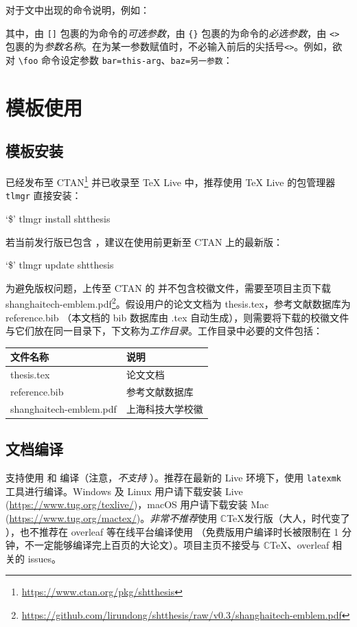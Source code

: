 \documentclass[master]{shtthesis}
\newcommand\prompt{\textup{\$}}
\providecommand{\emoji}[1]{ \fbox{\emph{#1}} }
\begin{document}
对于文中出现的命令说明，例如：
\begin{latex}
\end{latex}
其中，由 \verb|[]| 包裹的为命令的\emph{可选参数}，由 \verb|{}| 包裹的为命令的\emph{必选参数}，由 \verb|<>| 包裹的为\emph{参数名称}。在为某一参数赋值时，不必输入前后的尖括号\verb|<>|。例如，欲对 \verb|\foo| 命令设定参数 \verb|bar=this-arg|、\verb|baz=另一参数|：
\begin{latex}
\end{latex}

\chapter{模板使用}
\section{模板安装}
\shtthesis{} 已经发布至 CTAN\footnote{\url{https://www.ctan.org/pkg/shtthesis}} 并已收录至 \TeX{} Live 中，推荐使用 \TeX{} Live 的包管理器 \verb|tlmgr| 直接安装：
\begin{shell}
`\prompt' tlmgr install shtthesis
\end{shell}
若当前发行版已包含 \shtthesis{}，建议在使用前更新至 CTAN 上的最新版：
\begin{shell}
`\prompt' tlmgr update shtthesis
\end{shell}

为避免版权问题，上传至 CTAN 的 \shtthesis{} 并不包含校徽文件，需要至项目主页下载 shanghaitech-emblem.pdf\footnote{\url{https://github.com/lirundong/shtthesis/raw/v0.3/shanghaitech-emblem.pdf}}。假设用户的论文文档为 thesis.tex，参考文献数据库为 reference.bib （本文档的 bib 数据库由 \jobname.tex 自动生成），则需要将下载的校徽文件与它们放在同一目录下，下文称为\emph{工作目录}。工作目录中必要的文件包括：
\begin{center}
  \begin{tabular}{ll}
    \toprule
    文件名称 & 说明 \\
    \midrule 
    thesis.tex & 论文文档 \\
    reference.bib & 参考文献数据库 \\
    shanghaitech-emblem.pdf & 上海科技大学校徽 \\
    \bottomrule
  \end{tabular}
\end{center}

\section{文档编译}
\shtthesis{} 支持使用  和  编译（注意，\emph{不支持} ）。推荐在最新的  Live 环境下，使用 \verb|latexmk| 工具进行编译。Windows 及 Linux 用户请下载安装  Live (\url{https://www.tug.org/texlive/})，macOS 用户请下载安装 Mac (\url{https://www.tug.org/mactex/})。\emph{非常不推荐}使用 $\mathbb{C}$\TeX 发行版（大人，时代变了\emoji{unamused}），也不推荐在 overleaf 等在线平台编译使用 \shtthesis{} （免费版用户编译时长被限制在 1 分钟，不一定能够编译完上百页的大论文）。项目主页不接受与 $\mathbb{C}$\TeX、overleaf 相关的 issues。
\end{document}

